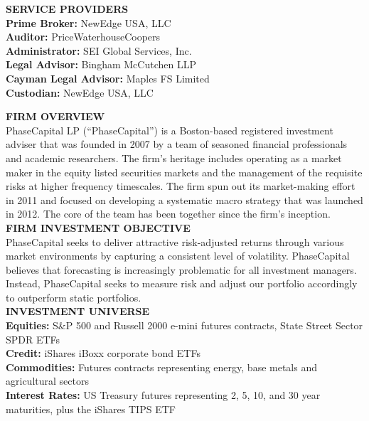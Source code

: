 \documentclass[9pt]{article}
\begin{document}
\textbf{\textcolor{phaseGold}{SERVICE PROVIDERS}} \\
  \textbf{Prime Broker:} NewEdge USA, LLC \\
  \textbf{Auditor:} PriceWaterhouseCoopers \\
  \textbf{Administrator:}  SEI Global Services, Inc. \\
  \textbf{Legal Advisor:} Bingham McCutchen LLP \\
  \textbf{Cayman Legal Advisor:} Maples FS Limited \\
  \textbf{Custodian:} NewEdge USA, LLC \\
\vfill \eject

\textbf{\textcolor{phaseGold}{FIRM OVERVIEW}} \\
PhaseCapital LP (``PhaseCapital'') is a Boston-based registered investment
adviser that was founded in 2007 by a team of seasoned financial professionals
and academic researchers. The firm's heritage includes operating as a market maker
in the equity listed securities markets and the management of the requisite
risks at higher frequency timescales. The firm spun out its market-making effort
in 2011 and focused on developing a systematic macro strategy that was launched
in 2012. The core of the team has been together since the firm's inception. \\

\textbf{\textcolor{phaseGold}{FIRM INVESTMENT OBJECTIVE}} \\
PhaseCapital seeks to deliver attractive risk-adjusted returns through various
market environments by capturing a consistent level of volatility. 
PhaseCapital believes that forecasting is increasingly
problematic for all investment managers. Instead, PhaseCapital seeks
to measure risk and adjust our portfolio accordingly to outperform
static portfolios. \\

\textbf{\textcolor{phaseGold}{INVESTMENT UNIVERSE}} \\
  \textbf{Equities:} S\&P 500 and Russell 2000 e-mini futures contracts,
     State Street Sector SPDR ETFs \\
  \textbf{Credit:} iShares iBoxx corporate bond ETFs \\ 
  \textbf{Commodities:} Futures contracts representing energy, base metals and
    agricultural sectors \\ 
  \textbf{Interest Rates:} US Treasury futures representing 2, 5, 10, and 30 year
    maturities, plus the iShares TIPS ETF \\
\end{document}
